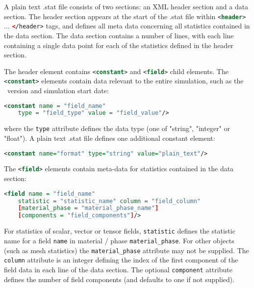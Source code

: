 A plain text .stat file consists of two sections: an XML header section and a
data section. The header section appears at the start of the .stat file within
\lstinline[language = XML]*<header>* $\ldots$
\lstinline[language = XML]*</header>* tags, and defines all meta data concerning
all statistics contained in the data section. The data section contains a number of lines,
with each line containing a single data point for each of the statistics defined in the header
section.

The header element contains 
\lstinline[language = XML]*<constant>* and
\lstinline[language = XML]*<field>* child elements. The
\lstinline[language = XML]*<constant>* elements contain data relevant to the
entire simulation, such as the \fluidity\ version and simulation start date:

\begin{lstlisting}[language = XML]
  <constant name = "field_name"
    type = "field_type" value = "field_value"/>
\end{lstlisting}

where the \lstinline[language = XML]*type* attribute defines the data type
(one of "string", "integer" or "float"). A plain text .stat file defines one
additional constant element:

\begin{lstlisting}[language = XML]
<constant name="format" type="string" value="plain_text"/>
\end{lstlisting}

The \lstinline[language = XML]*<field>* elements contain meta-data for statistics
contained in the data section:

\begin{lstlisting}[language = XML]
  <field name = "field_name"
    statistic = "statistic_name" column = "field_column"
    [material_phase = "material_phase_name"]
    [components = "field_components"]/>
\end{lstlisting}

For statistics of scalar, vector or tensor fields, 
\lstinline[language = XML]*statistic* defines the statistic name for
a field \lstinline[language = XML]*name* in material / phase
\lstinline[language = XML]*material_phase*. For other objects (such as mesh
statistics) the \lstinline[language = XML]*material_phase* attribute may not
be supplied. The \lstinline[language = XML]*column* attribute is an integer defining the
index of the first component of the field data in each line of the data section.
The optional \lstinline[language = XML]*component* attribute defines the number
of field components (and defaults to one if not supplied). 

